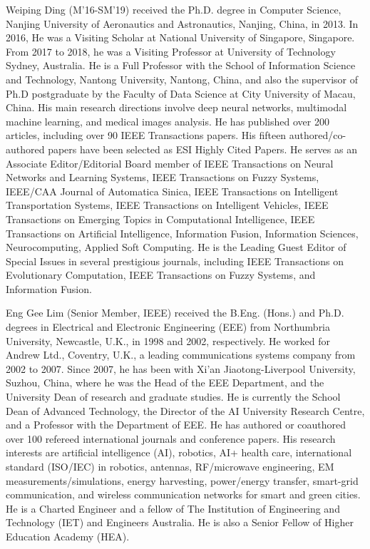 \documentclass[lettersize,journal]{IEEEtran}
\begin{document}
\begin{IEEEbiography}{Weiping Ding} (M'16-SM'19) received the Ph.D. degree in Computer Science, Nanjing University of Aeronautics and Astronautics, Nanjing, China, in 2013. In 2016, He was a Visiting Scholar at National University of Singapore, Singapore. From 2017 to 2018, he was a Visiting Professor at University of Technology Sydney, Australia. He is a Full Professor with the School of Information Science and Technology, Nantong University, Nantong, China, and also the supervisor of Ph.D postgraduate by the Faculty of Data Science at City University of Macau, China. His main research directions involve deep neural networks, multimodal machine learning, and medical images analysis. He has published over 200 articles, including over 90 IEEE Transactions papers. His fifteen authored/co-authored papers have been selected as ESI Highly Cited Papers. He serves as an Associate Editor/Editorial Board member of IEEE Transactions on Neural Networks and Learning Systems, IEEE Transactions on Fuzzy Systems, IEEE/CAA Journal of Automatica Sinica, IEEE Transactions on Intelligent Transportation Systems, IEEE Transactions on Intelligent Vehicles, IEEE Transactions on Emerging Topics in Computational Intelligence, IEEE Transactions on Artificial Intelligence, Information Fusion, Information Sciences, Neurocomputing, Applied Soft Computing. He is the Leading Guest Editor of Special Issues in several prestigious journals, including IEEE Transactions on Evolutionary Computation, IEEE Transactions on Fuzzy Systems, and Information Fusion.
\end{IEEEbiography}
\vspace{-1cm}
\begin{IEEEbiography}
{Eng Gee Lim}
(Senior Member, IEEE) received the B.Eng. (Hons.) and Ph.D. degrees in Electrical and Electronic Engineering (EEE) from Northumbria University, Newcastle, U.K., in 1998 and 2002,
respectively. He worked for Andrew Ltd., Coventry, U.K., a leading communications systems company from 2002 to 2007. Since 2007, he has been with Xi'an Jiaotong-Liverpool University, Suzhou, China, where he was the Head of the EEE Department, and the University Dean of research and graduate studies. He is currently the School Dean of Advanced Technology, the Director of the AI University Research Centre, and a Professor with the Department of EEE. He has authored or coauthored over 100 refereed international journals and conference papers. His research interests are artificial intelligence (AI), robotics, AI+ health care, international standard (ISO/IEC) in robotics, antennas, RF/microwave engineering, EM measurements/simulations, energy harvesting, power/energy transfer, smart-grid communication, and wireless communication networks for smart and green cities. He is a Charted Engineer and a fellow of The Institution of Engineering and Technology (IET) and Engineers Australia. He is also a Senior Fellow of Higher Education Academy (HEA).
\end{IEEEbiography}
\end{document}
